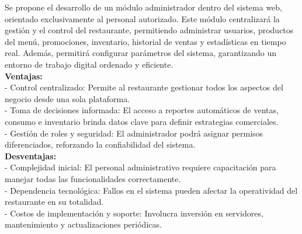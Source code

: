 \documentclass{article}
\begin{document}
\begin{doublespace}
    \noindent Se propone el desarrollo de un módulo administrador dentro del sistema web, orientado exclusivamente al personal autorizado. Este módulo centralizará la gestión y el control del restaurante, permitiendo administrar usuarios, productos del menú, promociones, inventario, historial de ventas y estadísticas en tiempo real. Además, permitirá configurar parámetros del sistema, garantizando un entorno de trabajo digital ordenado y eficiente.\\
    \textbf{Ventajas:}\\
    - Control centralizado: Permite al restaurante gestionar todos los aspectos del negocio desde una sola plataforma.\\
    - Toma de decisiones informada: El acceso a reportes automáticos de ventas, consumo e inventario brinda datos clave para definir estrategias comerciales.\\
    - Gestión de roles y seguridad: El administrador podrá asignar permisos diferenciados, reforzando la confiabilidad del sistema.\\
    \textbf{Desventajas:}\\
    - Complejidad inicial: El personal administrativo requiere capacitación para manejar todas las funcionalidades correctamente.\\
    - Dependencia tecnológica: Fallos en el sistema pueden afectar la operatividad del restaurante en su totalidad.\\
    - Costos de implementación y soporte: Involucra inversión en servidores, mantenimiento y actualizaciones periódicas.\\


\end{doublespace}
\end{document}
